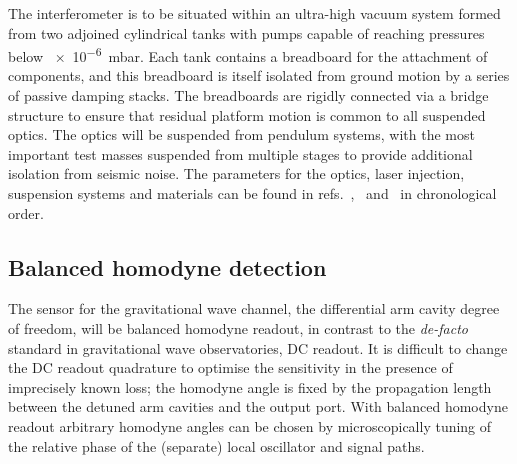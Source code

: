 The interferometer is to be situated within an ultra-high vacuum system formed from two adjoined cylindrical tanks with pumps capable of reaching pressures below \SI{e-6}{\milli\bar}. Each tank contains a breadboard for the attachment of components, and this breadboard is itself isolated from ground motion by a series of passive damping stacks. The breadboards are rigidly connected via a bridge structure to ensure that residual platform motion is common to all suspended optics. The optics will be suspended from pendulum systems, with the most important test masses suspended from multiple stages to provide additional isolation from seismic noise. The parameters for the optics, laser injection, suspension systems and materials can be found in refs.~\cite{Graef2014},~\cite{Danilishin2015} and~\cite{Leavey2016} in chronological order.

\subsection{\label{sec:bhd-intro}Balanced homodyne detection}
The sensor for the gravitational wave channel, the differential arm cavity degree of freedom, will be balanced homodyne readout, in contrast to the \emph{de-facto} standard in gravitational wave observatories, \gls{DC} readout. It is difficult to change the \gls{DC} readout quadrature to optimise the sensitivity in the presence of imprecisely known loss; the homodyne angle is fixed by the propagation length between the detuned arm cavities and the output port. With balanced homodyne readout arbitrary homodyne angles can be chosen by microscopically tuning of the relative phase of the (separate) local oscillator and signal paths.

